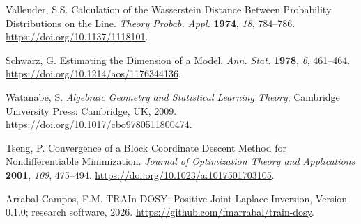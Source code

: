 Vallender, S.S. Calculation of the Wasserstein Distance Between Probability Distributions on the Line. \emph{Theory Probab. Appl.} \textbf{1974}, \emph{18}, 784--786. \url{https://doi.org/10.1137/1118101}.

Schwarz, G. Estimating the Dimension of a Model. \emph{Ann. Stat.} \textbf{1978}, \emph{6}, 461--464. \url{https://doi.org/10.1214/aos/1176344136}.

Watanabe, S. \emph{Algebraic Geometry and Statistical Learning Theory}; Cambridge University Press: Cambridge, UK, 2009. \url{https://doi.org/10.1017/cbo9780511800474}.

Tseng, P. Convergence of a Block Coordinate Descent Method for Nondifferentiable Minimization. \emph{Journal of Optimization Theory and Applications} \textbf{2001}, \emph{109}, 475--494. \url{https://doi.org/10.1023/a:1017501703105}.

Arrabal-Campos, F.M. TRAIn-DOSY: Positive Joint Laplace Inversion, Version 0.1.0; research software, 2026. \url{https://github.com/fmarrabal/train-dosy}.
